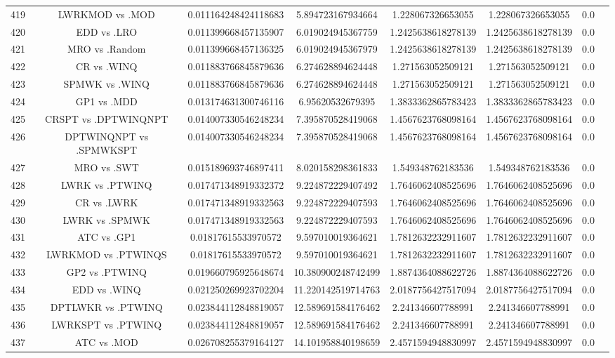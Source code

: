 \documentclass[a3paper,10pt]{article}
\begin{document}
\begin{table}[!htp]
\begin{tabular}{cccccccc}
419&LWRKMOD vs .MOD&0.011164248424118683&5.894723167934664&1.228067326653055&1.228067326653055&0.0\\
420&EDD vs .LRO&0.011399668457135907&6.019024945367759&1.2425638618278139&1.2425638618278139&0.0\\
421&MRO vs .Random&0.011399668457136325&6.019024945367979&1.2425638618278139&1.2425638618278139&0.0\\
422&CR vs .WINQ&0.011883766845879636&6.274628894624448&1.271563052509121&1.271563052509121&0.0\\
423&SPMWK vs .WINQ&0.011883766845879636&6.274628894624448&1.271563052509121&1.271563052509121&0.0\\
424&GP1 vs .MDD&0.013174631300746116&6.95620532679395&1.3833362865783423&1.3833362865783423&0.0\\
425&CRSPT vs .DPTWINQNPT&0.014007330546248234&7.395870528419068&1.4567623768098164&1.4567623768098164&0.0\\
426&DPTWINQNPT vs .SPMWKSPT&0.014007330546248234&7.395870528419068&1.4567623768098164&1.4567623768098164&0.0\\
427&MRO vs .SWT&0.015189693746897411&8.020158298361833&1.549348762183536&1.549348762183536&0.0\\
428&LWRK vs .PTWINQ&0.017471348919332372&9.224872229407492&1.7646062408525696&1.7646062408525696&0.0\\
429&CR vs .LWRK&0.017471348919332563&9.224872229407593&1.7646062408525696&1.7646062408525696&0.0\\
430&LWRK vs .SPMWK&0.017471348919332563&9.224872229407593&1.7646062408525696&1.7646062408525696&0.0\\
431&ATC vs .GP1&0.01817615533970572&9.597010019364621&1.7812632232911607&1.7812632232911607&0.0\\
432&LWRKMOD vs .PTWINQS&0.01817615533970572&9.597010019364621&1.7812632232911607&1.7812632232911607&0.0\\
433&GP2 vs .PTWINQ&0.019660795925648674&10.380900248742499&1.8874364088622726&1.8874364088622726&0.0\\
434&EDD vs .WINQ&0.021250269923702204&11.220142519714763&2.0187756427517094&2.0187756427517094&0.0\\
435&DPTLWKR vs .PTWINQ&0.023844112848819057&12.589691584176462&2.241346607788991&2.241346607788991&0.0\\
436&LWRKSPT vs .PTWINQ&0.023844112848819057&12.589691584176462&2.241346607788991&2.241346607788991&0.0\\
437&ATC vs .MOD&0.026708255379164127&14.101958840198659&2.4571594948830997&2.4571594948830997&0.0\\

\end{tabular}
\end{table}
\end{document}
